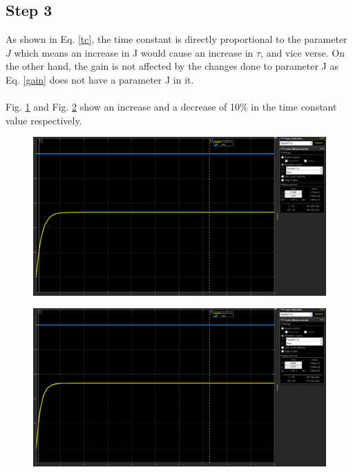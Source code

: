 \documentclass[hidelinks]{article}
\begin{document}
	\pagebreak
	\subsection{Step 3}
	As shown in Eq. \ref{tc}, the time constant is directly proportional to the parameter $J$ which means an increase in J would cause an increase in $\tau$, and vice verse.
	On the other hand, the gain is not affected by the changes done to parameter J as Eq. \ref{gain} does not have a parameter J in it.\\\\
	Fig. \ref{f3} and Fig. \ref{f4} show an increase and a decrease of 10\% in the time constant value respectively.
	\begin{figure}[htbp]
		\centering
		\includegraphics[width=0.6\textheight]{1_step3.1_+10.png}
		\label{f3}
	\end{figure}	
	\begin{figure}[htbp]
		\centering
		\includegraphics[width=0.6\textheight]{1_step3.1_-10.png}
		\label{f4}
	\end{figure}
\end{document}
